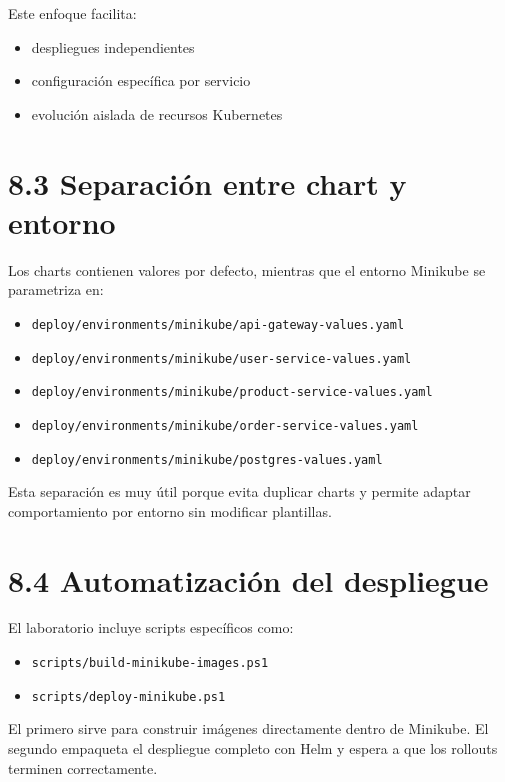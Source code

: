 \documentclass[
a4paper,
12pt]{report}
\providecommand{\tightlist}{%
  \setlength{\itemsep}{0pt}\setlength{\parskip}{0pt}}
\begin{document}
Este enfoque facilita:

\begin{itemize}
\tightlist
\item
  despliegues independientes
\item
  configuración específica por servicio
\item
  evolución aislada de recursos Kubernetes
\end{itemize}

\section{8.3 Separación entre chart y
entorno}\label{separaciuxf3n-entre-chart-y-entorno}

Los charts contienen valores por defecto, mientras que el entorno
Minikube se parametriza en:

\begin{itemize}
\tightlist
\item
  \texttt{deploy/environments/minikube/api-gateway-values.yaml}
\item
  \texttt{deploy/environments/minikube/user-service-values.yaml}
\item
  \texttt{deploy/environments/minikube/product-service-values.yaml}
\item
  \texttt{deploy/environments/minikube/order-service-values.yaml}
\item
  \texttt{deploy/environments/minikube/postgres-values.yaml}
\end{itemize}

Esta separación es muy útil porque evita duplicar charts y permite
adaptar comportamiento por entorno sin modificar plantillas.

\section{8.4 Automatización del
despliegue}\label{automatizaciuxf3n-del-despliegue}

El laboratorio incluye scripts específicos como:

\begin{itemize}
\tightlist
\item
  \texttt{scripts/build-minikube-images.ps1}
\item
  \texttt{scripts/deploy-minikube.ps1}
\end{itemize}

El primero sirve para construir imágenes directamente dentro de
Minikube. El segundo empaqueta el despliegue completo con Helm y espera
a que los rollouts terminen correctamente.
\end{document}

